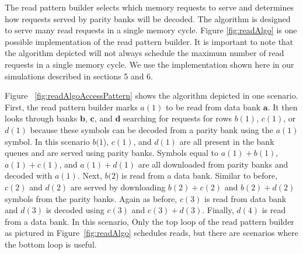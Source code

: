 The read pattern builder selects which memory requests to serve and determines how requests served by parity banks will be decoded. The algorithm is designed to serve many read requests in a single memory cycle. Figure \ref{fig:readAlgo} is one possible implementation of the read pattern builder. It is important to note that the algorithm depicted will not always schedule the maximum number of read requests in a single memory cycle. We use the implementation shown here in our simulations described in sections 5 and 6. 

Figure ~\ref{fig:readAlgoAccessPattern} shows the algorithm depicted in one scenario. First, the read pattern builder marks $a(1)$ to be read from data bank $\mathbf{a}$. It then looks through banks $\mathbf{b}$, $\mathbf{c}$, and $\mathbf{d}$ searching for requests for rows $b(1)$, $c(1)$, or $d(1)$ because these symbols can be decoded from a parity bank using the $a(1)$ symbol. In this scenario $b(1$), $c(1)$, and $d(1)$ are all present in the bank queues and are served using parity banks. Symbols equal to  $a(1) + b(1)$, $a(1) + c(1)$, and $a(1) + d(1)$ are all downloaded from parity banks and decoded with $a(1)$. Next, $b(2$) is read from a data bank. Similar to before, $c(2)$ and $d(2)$ are served by downloading $b(2) + c(2)$ and $b(2) + d(2)$ symbols from the parity banks. Again as before, $c(3)$ is read from data bank and $d(3)$ is decoded using $c(3)$ and $c(3) + d(3)$. Finally, $d(4)$ is read from a data bank. In this scenario, Only the top loop of the read pattern builder as pictured in Figure~\ref{fig:readAlgo} schedules reads, but there are scenarios where the bottom loop is useful. 

